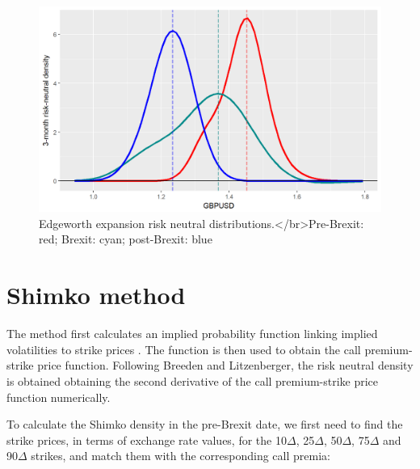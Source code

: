 \documentclass[]{book}
\theoremstyle{definition}
\theoremstyle{definition}
\theoremstyle{definition}
\theoremstyle{remark}
\begin{document}
\begin{figure}
\includegraphics[width=1\linewidth]{images/unnamed-chunk-59-1} \caption{Edgeworth expansion risk neutral distributions.</br>Pre-Brexit: red; Brexit: cyan; post-Brexit: blue}\label{fig:unnamed-chunk-59}
\end{figure}

\section{Shimko method}\label{shimko-method}

The method first calculates an implied probability function linking
implied volatilities to strike prices \citep{Shimko1993}. The function
is then used to obtain the call premium-strike price function. Following
Breeden and Litzenberger, the risk neutral density is obtained obtaining
the second derivative of the call premium-strike price function
numerically.

To calculate the Shimko density in the pre-Brexit date, we first need to
find the strike prices, in terms of exchange rate values, for the
10\(\Delta\), 25\(\Delta\), 50\(\Delta\), 75\(\Delta\) and 90\(\Delta\)
strikes, and match them with the corresponding call premia:
\end{document}
